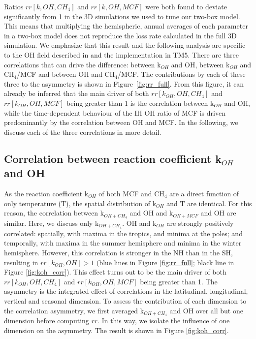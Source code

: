 \documentclass[10pt]{article}
\begin{document}
Ratios $rr[k, OH, CH_4]$ and $rr[k, OH, MCF]$ were both found to deviate significantly from 1 in the 3D simulations we used to tune our two-box model. This means that multiplying the hemispheric, annual averages of each parameter in a two-box model does not reproduce the loss rate calculated in the full 3D simulation. We emphasize that this result and the following analysis are specific to the OH field described in \cite{spivakovsky2000} and the implementation in TM5. There are three correlations that can drive the difference: between k$_{OH}$ and OH, between k$_{OH}$ and CH$_4$/MCF and between OH and CH$_4$/MCF. The contributions by each of these three to the asymmetry is shown in Figure~\ref{fig:rr_full}. From this figure, it can already be inferred that the main driver of both $rr[k_{OH}, OH, CH_4]$ and $rr[k_{OH}, OH, MCF]$ being greater than 1 is the correlation between k$_{OH}$ and OH, while the time-dependent behaviour of the IH OH ratio of MCF is driven predominantly by the correlation between OH and MCF. In the following, we discuss each of the three correlations in more detail.

\subsection{Correlation between reaction coefficient k$_{OH}$ and OH}

As the reaction coefficient k$_{OH}$ of both MCF and CH$_4$ are a direct function of only temperature (T), the spatial distribution of k$_{OH}$ and T are identical. For this reason, the correlation between k$_{OH+CH_4}$ and OH and k$_{OH+MCF}$ and OH are similar. Here, we discuss only k$_{OH+CH_4}$. OH and k$_{OH}$ are strongly positively correlated: spatially, with maxima in the tropics, and minima at the poles; and temporally, with maxima in the summer hemisphere and minima in the winter hemisphere. However, this correlation is stronger in the NH than in the SH, resulting in $rr[k_{OH}, OH]>1$ (blue lines in Figure \ref{fig:rr_full}; black line in Figure \ref{fig:koh_corr}). This effect turns out to be the main driver of both $rr[k_{OH}, OH, CH_4]$ and $rr[k_{OH}, OH, MCF]$ being greater than 1. The asymmetry is the integrated effect of correlations in the latitudinal, longitudinal, vertical and seasonal dimension. To assess the contribution of each dimension to the correlation asymmetry, we first averaged k$_{OH+CH_4}$ and OH over all but one dimension before computing $rr$. In this way, we isolate the influence of one dimension on the asymmetry. The result is shown in Figure \ref{fig:koh_corr}. 
\end{document}
